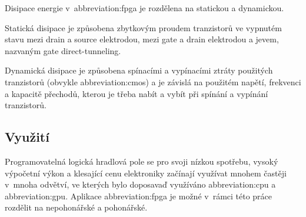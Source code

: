 \documentclass[a4paper, twoside, 11pt]{article}
\begin{document}
			Disipace energie v~\gls{abbreviation:fpga} je rozdělena na statickou a dynamickou.\par
			Statická disipace je způsobena zbytkovým proudem tranzistorů ve vypnutém stavu mezi drain a source elektrodou, mezi gate a drain elektrodou a jevem, nazvaným gate direct-tunneling. \cite{grover-reduction-of-power-consumption}\par
			Dynamická disipace je způsobena spínacími a vypínacími ztráty použitých tranzistorů (obvykle \gls{abbreviation:cmos}) a je závislá na použitém napětí, frekvenci a kapacitě přechodů, kterou je třeba nabít a vybít při spínání a vypínání tranzistorů. \cite{grover-reduction-of-power-consumption}


			
			\subsection{Využití}
			Programovatelná logická hradlová pole se pro svoji nízkou spotřebu, vysoký výpočetní výkon a klesající cenu elektroniky začínají využívat mnohem častěji v~mnoha odvětví, ve kterých bylo doposavaď využíváno \gls{abbreviation:cpu} a \gls{abbreviation:gpu}. Aplikace \gls{abbreviation:fpga} je možné v~rámci této práce rozdělit na nepohonářské a pohonářské.
\end{document}
